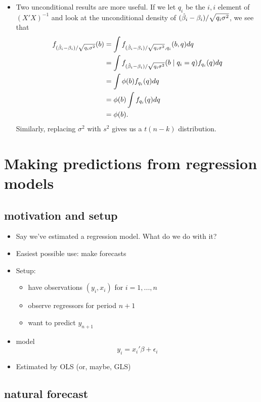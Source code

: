 \begin{itemize}[leftmargin=0pt]
\item Two unconditional results are more useful.  If we let $q_i$ be
  the $i,i$ element of $(X'X)^{-1}$ and look at the unconditional
  density of $(\hat{\beta}_i - \beta_i)/\sqrt{q_i \sigma^2}$, we see that
  \begin{align*}
    f_{(\hat{\beta}_i - \beta_i)/\sqrt{q_i \sigma^2}}(b)
    &= \int f_{(\hat{\beta}_i - \beta_i)/\sqrt{q_i \sigma^2}, q_i} (b, q) dq \\
    &= \int f_{(\hat{\beta}_i - \beta_i)/\sqrt{q_i \sigma^2}}(b \mid q_i = q) f_{q_i}(q) dq \\
    &= \int \phi(b) f_{q_i}(q) dq \\
    &= \phi(b) \int f_{q_i}(q) dq \\
    &= \phi(b).
  \end{align*}
  Similarly, replacing $\sigma^2$ with $s^2$ gives us a $t(n-k)$ distribution.

\end{itemize}

\section{Making predictions from regression models}

\subsection{motivation and setup}
\begin{itemize}[leftmargin=0pt]
\item Say we've estimated a regression model.  What do we do with it?
\item Easiest possible use: make forecasts
\item Setup:
\begin{itemize}
\item have observations $(y_i, x_i)$ for $i = 1,...,n$
\item observe regressors for period $n+1$
\item want to predict $y_{n+1}$
\end{itemize}
\item model \[ y_i = x_i'\beta + \epsilon_i \]
\item Estimated by OLS (or, maybe, GLS)
\end{itemize}

\subsection{natural forecast}

